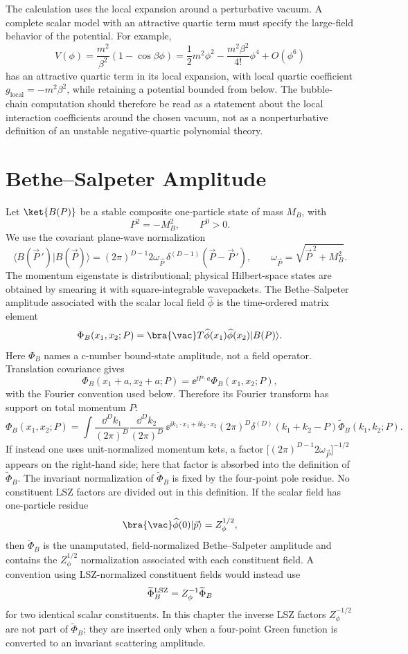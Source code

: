 The calculation uses the local expansion around a perturbative vacuum. A
complete scalar model with an attractive quartic term must specify the
large-field behavior of the potential. For example,
\[
  V(\phi)=\frac{m^2}{\beta^2}\left(1-\cos\beta\phi\right)
  =
  \frac12m^2\phi^2
  -\frac{m^2\beta^2}{4!}\phi^4
  +O(\phi^6)
\]
has an attractive quartic term in its local expansion, with local quartic
coefficient \(g_{\mathrm{local}}=-m^2\beta^2\), while retaining a potential
bounded from below. The bubble-chain computation should therefore be read as a
statement about the local interaction coefficients around the chosen vacuum,
not as a nonperturbative definition of an unstable negative-quartic polynomial
theory.

\section{Bethe--Salpeter Amplitude}

Let \(\ket{B(P)}\) be a stable composite one-particle state of mass \(M_B\),
with
\[
  P^2=-M_B^2,\qquad P^0>0 .
\]
We use the covariant plane-wave normalization
\[
  \langle B(\vec P\,')|B(\vec P)\rangle
  =
  (2\pi)^{D-1}2\omega_{\vec P}\,
  \delta^{(D-1)}(\vec P-\vec P\,'),
  \qquad
  \omega_{\vec P}=\sqrt{\vec P^{\,2}+M_B^2}.
\]
The momentum eigenstate is distributional; physical Hilbert-space states are
obtained by smearing it with square-integrable wavepackets.
The Bethe--Salpeter amplitude associated with the scalar local field
\(\widehat\phi\) is the time-ordered matrix element
\[
  \Phi_B(x_1,x_2;P)
  =
  \bra{\vac}T\widehat\phi(x_1)\widehat\phi(x_2)|B(P)\rangle .
\]
Here \(\Phi_B\) names a c-number bound-state amplitude, not a field operator.
Translation covariance gives
\[
  \Phi_B(x_1+a,x_2+a;P)
  =
  \ee^{\ii P\cdot a}\Phi_B(x_1,x_2;P),
\]
with the Fourier convention used below. Therefore its Fourier transform has
support on total momentum \(P\):
\[
  \Phi_B(x_1,x_2;P)
  =
  \int\frac{\dd^D k_1}{(2\pi)^D}
       \frac{\dd^D k_2}{(2\pi)^D}\,
  \ee^{\ii k_1\cdot x_1+\ii k_2\cdot x_2}
  (2\pi)^D\delta^{(D)}(k_1+k_2-P)
  \widetilde\Phi_B(k_1,k_2;P).
\]
If instead one uses unit-normalized momentum kets, a factor
\(\bigl[(2\pi)^{D-1}2\omega_{\vec P}\bigr]^{-1/2}\) appears on the right-hand
side; here that factor is absorbed into the definition of
\(\widetilde\Phi_B\). The invariant normalization of
\(\widetilde\Phi_B\) is fixed by the four-point pole residue.
No constituent LSZ factors are divided out in this definition.  If the scalar
field has one-particle residue
\[
  \bra{\vac}\widehat\phi(0)|\vec p\rangle=Z_\phi^{1/2},
\]
then \(\widetilde\Phi_B\) is the unamputated, field-normalized
Bethe--Salpeter amplitude and contains the \(Z_\phi^{1/2}\) normalization
associated with each constituent field.  A convention using LSZ-normalized
constituent fields would instead use
\[
  \widetilde\Phi_B^{\rm LSZ}
  =
  Z_\phi^{-1}\widetilde\Phi_B
\]
for two identical scalar constituents.  In this chapter the inverse LSZ factors
\(Z_\phi^{-1/2}\) are not part of \(\widetilde\Phi_B\); they are inserted only
when a four-point Green function is converted to an invariant scattering
amplitude.

